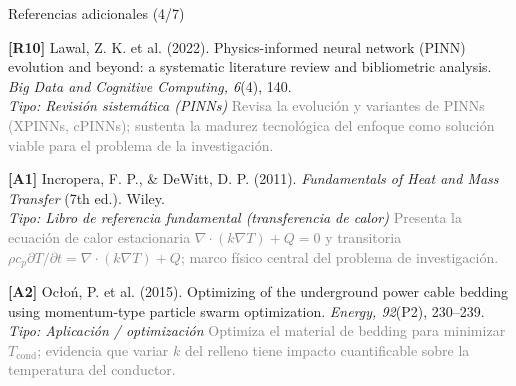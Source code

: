 \documentclass[aspectratio=169]{beamer}
\begin{document}
\begin{frame}{Referencias adicionales (4/7)}
\small\justifying

\textbf{[R10]} Lawal, Z. K. et al. (2022). Physics-informed neural network
(PINN) evolution and beyond: a systematic literature review and bibliometric
analysis. \textit{Big Data and Cognitive Computing, 6}(4), 140.\\
\textcolor{blue!60!black}{\footnotesize\textit{Tipo: Revisión sistemática (PINNs)}} \quad
\textcolor{gray}{\footnotesize Revisa la evolución y variantes de PINNs
(XPINNs, cPINNs); sustenta la madurez tecnológica del enfoque como solución
viable para el problema de la investigación.}

\medskip
\textbf{[A1]} Incropera, F. P., \& DeWitt, D. P. (2011). \textit{Fundamentals
of Heat and Mass Transfer} (7th ed.). Wiley.\\
\textcolor{purple!70!black}{\footnotesize\textit{Tipo: Libro de referencia fundamental (transferencia de calor)}} \quad
\textcolor{gray}{\footnotesize Presenta la ecuación de calor estacionaria
$\nabla\cdot(k\nabla T)+Q=0$ y transitoria $\rho c_p \partial T/\partial t =
\nabla\cdot(k\nabla T)+Q$; marco físico central del problema de investigación.}

\medskip
\textbf{[A2]} Ocłoń, P. et al. (2015). Optimizing of the underground power
cable bedding using momentum-type particle swarm optimization. \textit{Energy,
92}(P2), 230--239.\\
\textcolor{purple!70!black}{\footnotesize\textit{Tipo: Aplicación / optimización}} \quad
\textcolor{gray}{\footnotesize Optimiza el material de bedding para minimizar
$T_{\text{cond}}$; evidencia que variar $k$ del relleno tiene impacto
cuantificable sobre la temperatura del conductor.}
\end{frame}
\end{document}
